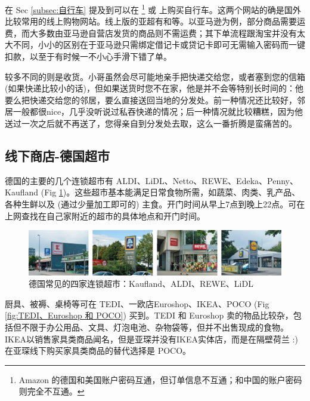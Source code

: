     在 Sec \ref{subsec:自行车} 提及到可以在 \href{https://amazon.de/}{}\footnote{Amazon 的德国和美国账户密码互通，但订单信息不互通；和中国的账户密码则完全不互通。} 或 \href{https://www.ebay.de/}{} 上购买自行车。这两个网站的确是国外比较常用的线上购物网站。线上版的亚超有\href{https://www.yachao.de/}{}和\href{https://www.yachaoonline.com/index.php}{}等。以亚马逊为例，部分商品需要运费，而大多数由亚马逊自营店发货的商品则不需运费；其下单流程跟淘宝并没有太大不同，小小的区别在于亚马逊只需绑定借记卡或贷记卡即可无需输入密码而一键扣款，以至于有时候一不小心手滑下错了单。

    较多不同的则是收货。小哥虽然会尽可能地亲手把快递交给您，或者塞到您的信箱 (如果快递比较小的话)，但如果送货时您不在家，他是并不会等特别长时间的：他要么把快递交给您的邻居，要么直接送回当地的分发处。前一种情况还比较好，邻居一般都很nice，几乎没听说过私吞快递的情况；后一种情况就比较糟糕，因为他送过一次之后就不再送了，您得亲自到分发处去取，这么一番折腾是蛮痛苦的。

  \subsection{线下商店-德国超市}\label{subsec:线下商店-德国超市}

    德国的主要的几个连锁超市有 ALDI、LiDL、Netto、REWE、Edeka、Penny、Kaufland (Fig \ref{fig:德国常见的四家连锁超市})。这些超市基本能满足日常食物所需，如蔬菜、肉类、乳产品、各种生鲜以及 (通过少量加工即可的) 主食。开门时间从早上7点到晚上22点。可在上网查找在自己家附近的超市的具体地点和开门时间。

    \begin{figure}[ht]
      \centering
      \includegraphics[width=\textwidth]{在亚琛学习和生活/日常消费和饮食/德国超市/德国常见的四家连锁超市：Kaufland、ALDI、REWE、LiDL.png}
      \caption{德国常见的四家连锁超市：Kaufland、ALDI、REWE、LiDL}
      \label{fig:德国常见的四家连锁超市}
    \end{figure}

    厨具、被褥、桌椅等可在 TEDI、一欧店Euroshop、IKEA、POCO (Fig \ref{fig:TEDI、Euroshop 和 POCO}) 买到。TEDI 和 Euroshop 卖的物品比较杂，包括但不限于办公用品、文具、灯泡电池、杂物袋等，但并不出售现成的食物。IKEA以销售家具类商品闻名，但是亚琛并没有IKEA实体店，而是在隔壁荷兰 :) 在亚琛线下购买家具类商品的替代选择是 POCO。

